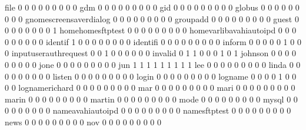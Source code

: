 \documentclass[compress,8pt]{beamer}
\begin{document}
\begin{frame}
\begin{Schunk}
  file                                       0   0   0   0   0   0   0   0   0
  gdm                                        0   0   0   0   0   0   0   0   0
  gid                                        0   0   0   0   0   0   0   0   0
  globus                                     0   0   0   0   0   0   0   0   0
  gnomescreensaverdialog                     0   0   0   0   0   0   0   0   0
  groupadd                                   0   0   0   0   0   0   0   0   0
  guest                                      0   0   0   0   0   0   0   0   1
  homehomesftptest                           0   0   0   0   0   0   0   0   0
  homevarlibavahiautoipd                     0   0   0   0   0   0   0   0   0
  identif                                    1   0   0   0   0   0   0   0   0
  identifi                                   0   0   0   0   0   0   0   0   0
  inform                                     0   0   0   0   0   1   0   0   0
  inputuserauthrequest                       0   0   1   0   0   0   0   0   0
  invalid                                    0   1   1   0   0   0   1   0   1
  johnson                                    0   0   0   0   0   0   0   0   0
  jone                                       0   0   0   0   0   0   0   0   0
  jun                                        1   1   1   1   1   1   1   1   1
  lee                                        0   0   0   0   0   0   0   0   0
  linda                                      0   0   0   0   0   0   0   0   0
  listen                                     0   0   0   0   0   0   0   0   0
  login                                      0   0   0   0   0   0   0   0   0
  logname                                    0   0   0   0   1   0   0   0   0
  lognamerichard                             0   0   0   0   0   0   0   0   0
  mar                                        0   0   0   0   0   0   0   0   0
  mari                                       0   0   0   0   0   0   0   0   0
  marin                                      0   0   0   0   0   0   0   0   0
  martin                                     0   0   0   0   0   0   0   0   0
  mode                                       0   0   0   0   0   0   0   0   0
  mysql                                      0   0   0   0   0   0   0   0   0
  nameavahiautoipd                           0   0   0   0   0   0   0   0   0
  namesftptest                               0   0   0   0   0   0   0   0   0
  news                                       0   0   0   0   0   0   0   0   0
  nov                                        0   0   0   0   0   0   0   0   0

\end{Schunk}
\end{frame}
\end{document}
